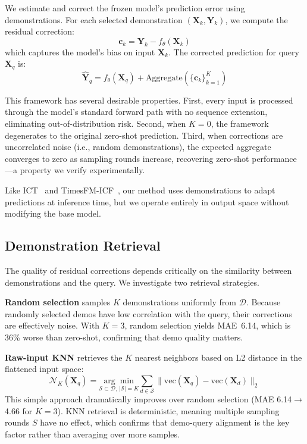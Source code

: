 \documentclass[conference]{IEEEtran}
\begin{document}
We estimate and correct the frozen model's prediction error using demonstrations.
For each selected demonstration $(\mathbf{X}_k, \mathbf{Y}_k)$, we compute the residual correction:
\begin{equation}
\mathbf{c}_k = \mathbf{Y}_k - f_\theta(\mathbf{X}_k)
\end{equation}
which captures the model's bias on input $\mathbf{X}_k$.
The corrected prediction for query $\mathbf{X}_q$ is:
\begin{equation}
\hat{\mathbf{Y}}_q = f_\theta(\mathbf{X}_q) + \mathrm{Aggregate}\!\left(\{\mathbf{c}_k\}_{k=1}^K\right)
\label{eq:correction}
\end{equation}

This framework has several desirable properties.
First, every input is processed through the model's standard forward path with no sequence extension, eliminating out-of-distribution risk.
Second, when $K = 0$, the framework degenerates to the original zero-shot prediction.
Third, when corrections are uncorrelated noise (i.e., random demonstrations), the expected aggregate converges to zero as sampling rounds increase, recovering zero-shot performance---a property we verify experimentally.

Like ICT~\cite{chen2022ict} and TimesFM-ICF~\cite{das2024icf}, our method uses demonstrations to adapt predictions at inference time, but we operate entirely in output space without modifying the base model.

\subsection{Demonstration Retrieval}

The quality of residual corrections depends critically on the similarity between demonstrations and the query.
We investigate two retrieval strategies.

\textbf{Random selection} samples $K$ demonstrations uniformly from $\mathcal{D}$.
Because randomly selected demos have low correlation with the query, their corrections are effectively noise.
With $K=3$, random selection yields MAE~6.14, which is 36\% worse than zero-shot, confirming that demo quality matters.

\textbf{Raw-input KNN} retrieves the $K$ nearest neighbors based on L2 distance in the flattened input space:
\begin{equation}
\mathcal{N}_K(\mathbf{X}_q) = \underset{\mathcal{S} \subset \mathcal{D},\, |\mathcal{S}|=K}{\arg\min} \sum_{d \in \mathcal{S}} \|\mathrm{vec}(\mathbf{X}_q) - \mathrm{vec}(\mathbf{X}_d)\|_2
\end{equation}
This simple approach dramatically improves over random selection (MAE 6.14$\to$4.66 for $K=3$).
KNN retrieval is deterministic, meaning multiple sampling rounds $S$ have no effect, which confirms that demo-query alignment is the key factor rather than averaging over more samples.
\end{document}
